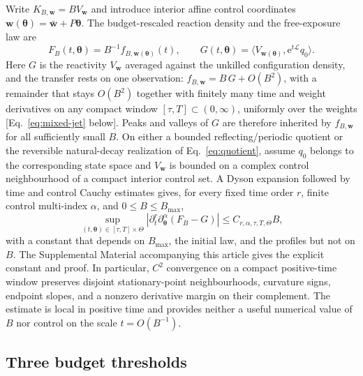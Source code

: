 \documentclass[aps,physrev,reprint,amsmath,amssymb,longbibliography,floatfix]{revtex4-2}
\newcommand{\e}{\mathrm e}
\begin{document}
Write \(K_{B,\bm w}=BV_{\bm w}\) and introduce interior affine control
coordinates \(\bm w(\bm\theta)=\bar{\bm w}+P\bm\theta\).  The
budget-rescaled reaction density and the free-exposure law are
\begin{equation}
 F_B(t,\bm\theta)=B^{-1}f_{B,\bm w(\bm\theta)}(t),
 \qquad
 G(t,\bm\theta)=
 \langle V_{\bm w(\bm\theta)},\e^{t\mathcal L}q_0\rangle.
 \label{eq:normalized-exposure}
\end{equation}
Here \(G\) is the reactivity \(V_{\bm w}\) averaged against the unkilled
configuration density, and the transfer rests on one observation:
\(f_{B,\bm w}=B\,G+O(B^2)\), with a remainder that stays \(O(B^2)\)
together with finitely many time and weight derivatives on any compact
window \([\tau,T]\subset(0,\infty)\), uniformly over the weights
[Eq.~\eqref{eq:mixed-jet} below].  Peaks and valleys of \(G\) are therefore
inherited by \(f_{B,\bm w}\) for all sufficiently small \(B\).
On either a bounded reflecting/periodic quotient or the reversible
natural-decay realization of Eq.~\eqref{eq:quotient}, assume \(q_0\) belongs
to the corresponding state space and \(V_{\bm w}\) is bounded on a complex
control neighbourhood of a compact interior control set.  A
Dyson expansion followed by time and control Cauchy estimates gives, for
every fixed time order \(r\), finite control multi-index \(\alpha\), and
\(0\le B\le B_{\max}\),
\begin{equation}
 \sup_{(t,\bm\theta)\in[\tau,T]\times\Theta}
 \left|
 \partial_t^r\partial_{\bm\theta}^{\alpha}(F_B-G)
 \right|
 \le C_{r,\alpha,\tau,T,\Theta}B,
 \label{eq:mixed-jet}
\end{equation}
with a constant that depends on \(B_{\max}\), the initial law, and the
profiles but not on \(B\).
The Supplemental Material accompanying this article
\cite{supplementalMaterial} gives the explicit constant and proof.  In
particular, \(C^2\) convergence on a compact positive-time window preserves
disjoint stationary-point neighbourhoods, curvature signs, endpoint slopes,
and a nonzero derivative margin on their complement.  The estimate is local
in positive time and provides neither a useful numerical value of \(B\) nor
control on the scale \(t=O(B^{-1})\).

\subsection{Three budget thresholds}
\label{sec:thresholds}
\end{document}
